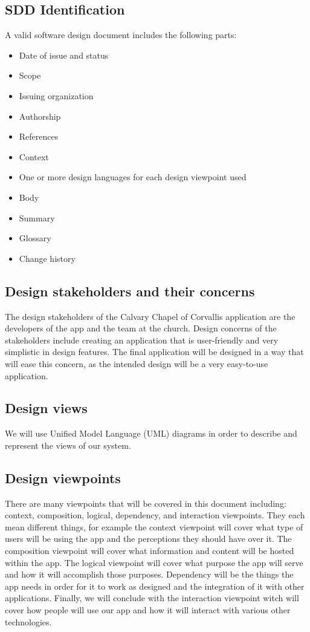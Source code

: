 \documentclass[letterpaper,10pt,draftclsnofoot,onecolumn,titlepage]{IEEEtran}
\begin{document}
		\subsection{SDD Identification}
			A valid software design document includes the following parts:
			\begin{itemize}
				\item{Date of issue and status}
				\item{Scope}
				\item{Issuing organization}
				\item{Authorship}
				\item{References}
				\item{Context}
				\item{One or more design languages for each design viewpoint used}
				\item{Body}
				\item{Summary}
				\item{Glossary}
				\item{Change history}
			\end{itemize}

		\subsection{Design stakeholders and their concerns}
			The design stakeholders of the Calvary Chapel of Corvallis application are the developers of the app and the team at the church.
			Design concerns of the stakeholders include creating an application that is user-friendly and very simplistic in design features.
			The final application will be designed in a way that will ease this concern, as the intended design will be a very easy-to-use application.

		\subsection{Design views}
		We will use Unified Model Language (UML) diagrams in order to describe and represent the views of our system.

		\subsection{Design viewpoints}
		There are many viewpoints that will be covered in this document including: context, composition, logical, dependency, and interaction viewpoints.
		They each mean different things, for example the context viewpoint will cover what type of users will be using the app and the perceptions they should have over it.
		The composition viewpoint will cover what information and content will be hosted within the app.
		The logical viewpoint will cover what purpose the app will serve and how it will accomplish those purposes.
		Dependency will be the things the app needs in order for it to work as designed and the integration of it with other applications.
		Finally, we will conclude with the interaction viewpoint witch will cover how people will use our app and how it will interact with various other technologies.
\end{document}
